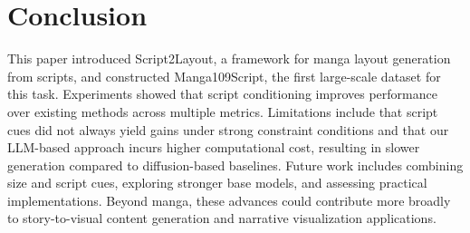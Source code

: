 \section{Conclusion}

This paper introduced Script2Layout, a framework for manga layout generation from scripts, and constructed Manga109Script, the first large-scale dataset for this task. Experiments showed that script conditioning improves performance over existing methods across multiple metrics. Limitations include that script cues did not always yield gains under strong constraint conditions and that our LLM-based approach incurs higher computational cost, resulting in slower generation compared to diffusion-based baselines. Future work includes combining size and script cues, exploring stronger base models, and assessing practical implementations. Beyond manga, these advances could contribute more broadly to story-to-visual content generation and narrative visualization applications.